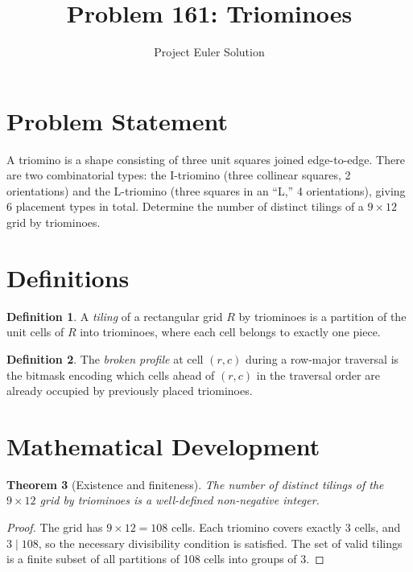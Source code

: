 \documentclass[12pt]{article}
\title{Problem 161: Triominoes}
\author{Project Euler Solution}
\date{}
\newtheorem{theorem}{Theorem}
\theoremstyle{definition}
\newtheorem{definition}[theorem]{Definition}
\begin{document}
\maketitle

\section{Problem Statement}
A triomino is a shape consisting of three unit squares joined edge-to-edge. There are two combinatorial types: the I-triomino (three collinear squares, 2 orientations) and the L-triomino (three squares in an ``L,'' 4 orientations), giving 6 placement types in total. Determine the number of distinct tilings of a $9 \times 12$ grid by triominoes.

\section{Definitions}

\begin{definition}
A \emph{tiling} of a rectangular grid $R$ by triominoes is a partition of the unit cells of $R$ into triominoes, where each cell belongs to exactly one piece.
\end{definition}

\begin{definition}
The \emph{broken profile} at cell $(r,c)$ during a row-major traversal is the bitmask encoding which cells ahead of $(r,c)$ in the traversal order are already occupied by previously placed triominoes.
\end{definition}

\section{Mathematical Development}

\begin{theorem}[Existence and finiteness]
The number of distinct tilings of the $9 \times 12$ grid by triominoes is a well-defined non-negative integer.
\end{theorem}

\begin{proof}
The grid has $9 \times 12 = 108$ cells. Each triomino covers exactly 3 cells, and $3 \mid 108$, so the necessary divisibility condition is satisfied. The set of valid tilings is a finite subset of all partitions of 108 cells into groups of 3.
\end{proof}
\end{document}
